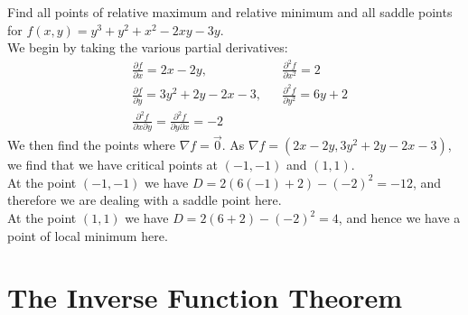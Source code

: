 \documentclass[12pt]{book}
\newenvironment{exercise}[2][Exercise]{\begin{trivlist}
\item[\hskip \labelsep {\bfseries #1}\hskip \labelsep {\bfseries #2.}]}{\end{trivlist}}
\begin{document}
\begin{exercise}{9.5.9}
    Find all  points of relative maximum and relative minimum and all saddle points for $f(x,y) = y^3 + y^2 +x^2 - 2 x y -3y$.  \\
    
    We begin by taking the various partial derivatives:
    \begin{align*}
        &\frac{\partial f}{\partial x} = 2x-2y, &&\frac{\partial^2 f}{\partial x^2} = 2 \\
        &\frac{\partial f}{\partial y} = 3y^2+2y-2x-3, &&\frac{\partial^2 f}{\partial y^2}=6y+2\\
        &\frac{\partial^2 f}{\partial x \partial y} = \frac{\partial^2 f}{\partial y \partial x} = -2
    \end{align*}
    We then find the points where $\nabla f= \vec{0}$. As $\nabla f= \left( 2x-2y, 3y^2+2y-2x-3\right)$, we find that we have critical points at $(-1,-1)$ and $(1,1)$. \\
    At the point $(-1,-1)$ we have $D=2 (6(-1)+2) - (-2)^2= -12$, and therefore we are dealing with a saddle point here.\\
    At the point $(1,1)$ we have $D=2(6+2)-(-2)^2=4$, and hence we have a point of local minimum here.
\end{exercise}




\section{The Inverse Function Theorem}
\end{document}
